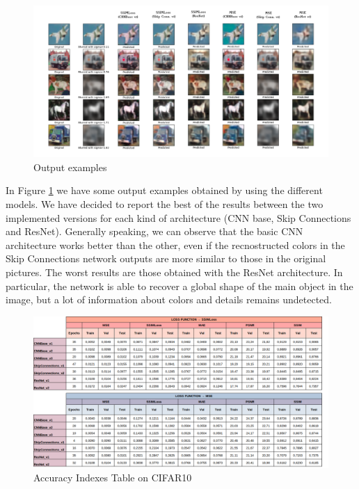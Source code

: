 \documentclass[12pt,a4paper]{article}
\begin{document}
\begin{figure}[hptb]
\centering
\includegraphics[scale=0.26]{Outputs_comparison.png}
\caption{Output examples}
\label{CIFAR10Output}
\end{figure}

In Figure \ref{CIFAR10Output} we have some output examples obtained by using the different models. We have decided to report the best of the results between the two implemented versions for each kind of architecture (CNN base, Skip Connections and ResNet).
Generally speaking, we can observe that the basic CNN architecture works better than the other, even if the recnostructed colors in the Skip Connections network outputs are more similar to those in the original pictures. The worst results are those obtained with the ResNet architecture. In particular, the network is able to recover a global shape of the main object in the image, but a lot of information about colors and details remains undetected.

\begin{figure}[hptb]
\centering
\includegraphics[scale=0.45]{table.png}
\caption{Accuracy Indexes Table on CIFAR10}
\label{Table1}
\end{figure}
\end{document}
